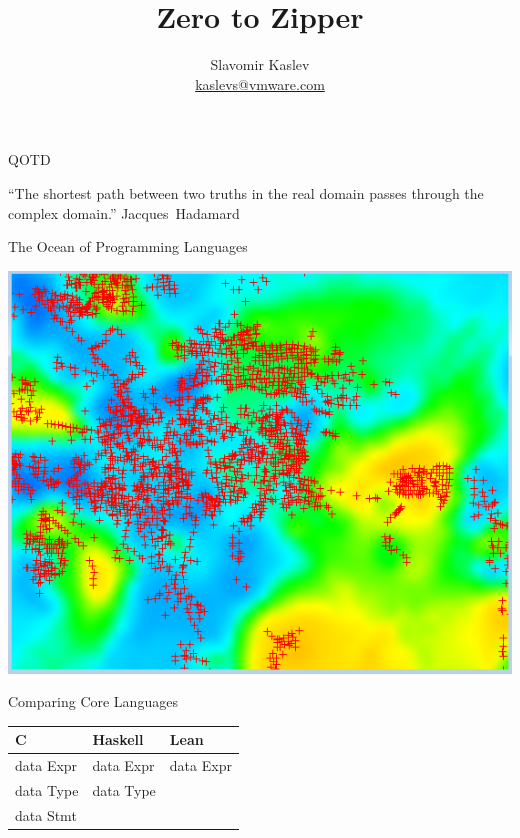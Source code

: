\documentclass[pdf]{beamer}
\title{Zero to Zipper}
\author{Slavomir Kaslev \\
  \href{mailto:kaslevs@vmware.com}{kaslevs@vmware.com}}
\begin{document}
\begin{frame}
  \titlepage
\end{frame}

\begin{frame}{QOTD}
  \begin{outline}
    \1 ``The shortest path between two truths in the real domain passes through the complex domain.'' \mbox{Jacques Hadamard}
  \end{outline}
\end{frame}

\begin{frame}{The Ocean of Programming Languages}
  \begin{center}
    \includegraphics[scale=0.7]{images/points}
  \end{center}
\end{frame}

\begin{frame}{Comparing Core Languages}
  \begin{table}[]
    \noindent
    \begin{tabular}{|l|l|l|}
      \hline
      \textbf{C}  & \textbf{Haskell}  & \textbf{Lean} \\
      \hline
      data Expr   & data Expr         & data Expr     \\
      data Type   & data Type         &               \\
      data Stmt   &                   &               \\
      \hline
    \end{tabular}
  \end{table}
\end{frame}
\end{document}
